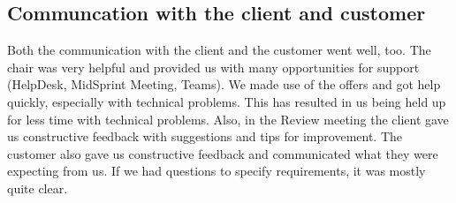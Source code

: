\subsection{Communcation with the client and customer}
Both the communication with the client and the customer went well, too.
The chair was very helpful and provided us with many opportunities for support (HelpDesk, MidSprint Meeting, Teams).
We made use of the offers and got help quickly, especially with technical problems.
This has resulted in us being held up for less time with technical problems.
Also, in the Review meeting the client gave us constructive feedback with suggestions and tips for improvement.
The customer also gave us constructive feedback and communicated what they were expecting from us.
If we had questions to specify requirements, it was mostly quite clear.